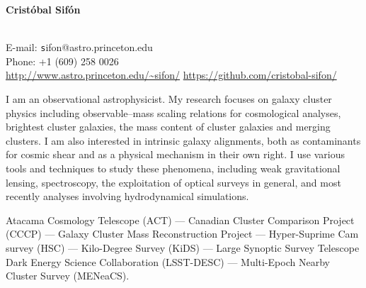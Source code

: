 \documentclass[11pt]{article}
\begin{document}
\begin{minipage}[b]{0.46\linewidth}
\flushleft
\hspace{-0.7cm}
{\bf\huge Crist\'obal Sif\'on}\\\vspace{0.2cm}
\\
\end{minipage}
\begin{minipage}[b]{0.49\linewidth}
\flushright
{\large E-mail: {\texttt sifon@astro.princeton.edu}\\
        Phone: +1 (609) 258 0026\\
        \url{http://www.astro.princeton.edu/~sifon/}
        \url{https://github.com/cristobal-sifon/}}
\end{minipage}
\vspace{0.4cm}
\hline




I am an observational astrophysicist. My research focuses on galaxy cluster physics including observable--mass scaling relations for cosmological analyses, brightest cluster galaxies, the mass content of cluster galaxies and merging clusters. I am also interested in intrinsic galaxy alignments, both as contaminants for cosmic shear and as a physical mechanism in their own right. I use various tools and techniques to study these phenomena, including weak gravitational lensing, spectroscopy, the exploitation of optical surveys in general, and most recently analyses involving hydrodynamical simulations. %

\vspace{0.5cm}
{
 Atacama Cosmology Telescope (ACT) ---
 Canadian Cluster Comparison Project (CCCP) ---
 Galaxy Cluster Mass Reconstruction Project ---
 Hyper-Suprime Cam survey (HSC) ---
 Kilo-Degree Survey (KiDS) ---
 Large Synoptic Survey Telescope Dark Energy Science Collaboration (LSST-DESC) ---
 Multi-Epoch Nearby Cluster Survey (MENeaCS).
}
\end{document}
